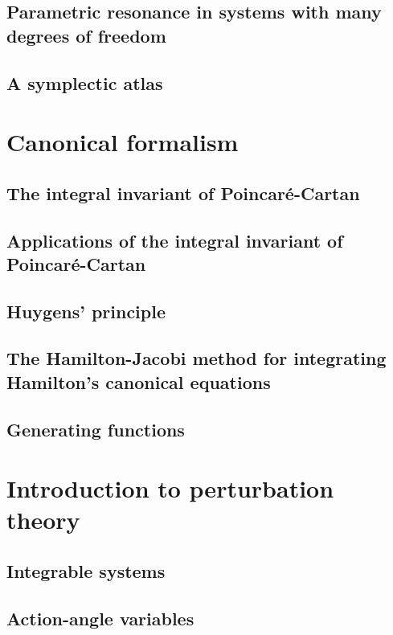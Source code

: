 \documentclass{book}
\numberwithin{equation}{section}
\theoremstyle{plain}
\theoremstyle{definition}
\theoremstyle{remark}
\theoremstyle{remark}
\begin{document}
\section{Parametric resonance in systems with many degrees of freedom}

\section{A symplectic atlas}

\chapter{Canonical formalism}

\section{The integral invariant of Poincar\'e-Cartan}

\section{Applications of the integral invariant of Poincar\'e-Cartan}

\section{Huygens' principle}

\section{The Hamilton-Jacobi method for integrating Hamilton's canonical equations}

\section{Generating functions}

\chapter{Introduction to perturbation theory}

\section{Integrable systems}

\section{Action-angle variables}
\end{document}

